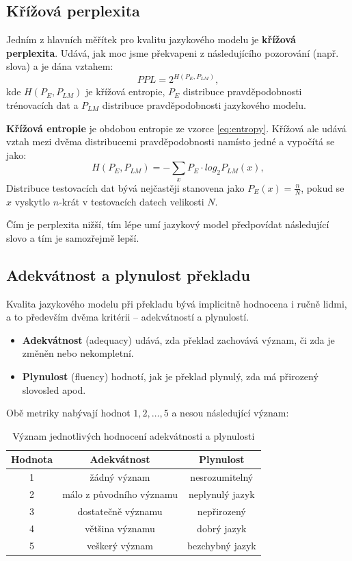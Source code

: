 \documentclass[12pt,a4paper]{report}
\begin{document}
\subsection{Křížová perplexita}
Jedním z hlavních měřítek pro kvalitu jazykového modelu je \textbf{křížová perplexita}. Udává, jak moc jsme překvapeni z následujícího pozorování (např. slova) a je dána vztahem:
\begin{equation}
PPL = 2^{H(P_E, P_{LM})},
\end{equation}
kde $H(P_E, P_{LM})$ je křížová entropie, $P_E$ distribuce pravděpodobnosti trénovacích dat a $P_{LM}$ distribuce pravděpodobnosti jazykového modelu.

\textbf{Křížová entropie} je obdobou entropie ze vzorce \eqref{eq:entropy}. Křížová ale udává vztah mezi dvěma distribucemi pravděpodobnosti namísto jedné a vypočítá se jako:
\begin{equation}
H(P_E, P_{LM}) = -\sum_x {P_E} \cdot log_2 P_{LM}(x),
\end{equation}
Distribuce testovacích dat bývá nejčastěji stanovena jako $P_E(x) = \frac{n}{N}$, pokud se $x$ vyskytlo $n$-krát v testovacích datech velikosti $N$.

Čím je perplexita nižší, tím lépe umí jazykový model předpovídat následující slovo a tím je samozřejmě lepší.

\subsection{Adekvátnost a plynulost překladu}
Kvalita jazykového modelu při překladu bývá implicitně hodnocena i ručně lidmi, a to především dvěma kritérii -- adekvátností a plynulostí.

\begin{itemize}
\item{\textbf{Adekvátnost} (adequacy) udává, zda překlad zachovává význam, či zda je změněn nebo nekompletní.}
\item{\textbf{Plynulost} (fluency) hodnotí, jak je překlad plynulý, zda má přirozený slovosled apod.}
\end{itemize}

Obě metriky nabývají hodnot $1, 2, \ldots, 5$ a nesou následující význam:

\begin{table}[!htbp]
\begin{center}\begin{tabular}{|c|c|c|}
\hline
\textbf{Hodnota} & \textbf{Adekvátnost} & \textbf{Plynulost}\\
\hline
1 & žádný význam & nesrozumitelný \\
\hline
2 & málo z původního významu & neplynulý jazyk \\
\hline
3 & dostatečně významu & nepřirozený \\
\hline
4 & většina významu & dobrý jazyk \\
\hline
5 & veškerý význam & bezchybný jazyk \\
\hline
\end{tabular}
\caption{Význam jednotlivých hodnocení adekvátnosti a plynulosti}\label{tb:vyznamflad}
\end{center}\end{table}
\end{document}
